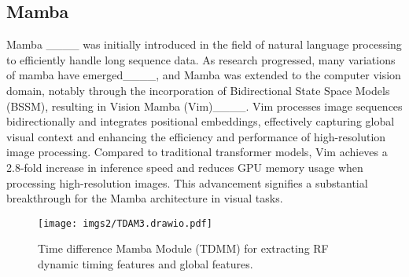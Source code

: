 \vspace{-0.8em}
\subsection{Mamba}
Mamba ____ was initially introduced in the field of natural language processing to efficiently handle long sequence data. As research progressed, many variations of mamba have emerged____, and Mamba was extended to the computer vision domain, notably through the incorporation of Bidirectional State Space Models (BSSM), resulting in Vision Mamba (Vim)____. Vim processes image sequences bidirectionally and integrates positional embeddings, effectively capturing global visual context and enhancing the efficiency and performance of high-resolution image processing. Compared to traditional transformer models, Vim achieves a 2.8-fold increase in inference speed and reduces GPU memory usage when processing high-resolution images. This advancement signifies a substantial breakthrough for the Mamba architecture in visual tasks.


\begin{figure}
\centering
\texttt{[image: imgs2/TDAM3.drawio.pdf]}
\vspace{-1.5em}
\caption{Time difference Mamba Module (TDMM) for extracting RF dynamic timing features and global features. }
\label{fig:domain adaptation}
\vspace{-0.2em}
\end{figure}

\vspace{-0.5em}
